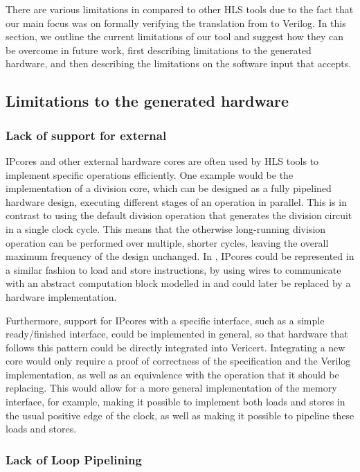 There are various limitations in \vericert{} compared to other HLS tools due to
the fact that our main focus was on formally verifying the translation from
\rtl{} to Verilog.  In this section, we outline the current limitations of our
tool and suggest how they can be overcome in future work, first describing
limitations to the generated hardware, and then describing the limitations on
the software input that \vericert{} accepts.

\subsection{Limitations to the generated hardware}

\subsubsection{Lack of support for external }

\Glspl{IPcore} and other external hardware cores are often used by \gls{HLS}
tools to implement specific operations efficiently.  One example would be the
implementation of a division core, which can be designed as a fully pipelined
hardware design, executing different stages of an operation in parallel.  This
is in contrast to using the default division operation that generates the
division circuit in a single clock cycle.  This means that the otherwise
long-running division operation can be performed over multiple, shorter cycles,
leaving the overall maximum frequency of the design unchanged.  In \htl{},
\glspl{IPcore} could be represented in a similar fashion to load and store
instructions, by using wires to communicate with an abstract computation block
modelled in \htl{} and could later be replaced by a hardware implementation.

Furthermore, support for \glspl{IPcore} with a specific interface, such as a
simple ready/finished interface, could be implemented in general, so that
hardware that follows this pattern could be directly integrated into Vericert.
Integrating a new core would only require a proof of correctness of the
specification and the Verilog implementation, as well as an equivalence with the
operation that it should be replacing.  This would allow for a more general
implementation of the memory interface, for example, making it possible to
implement both loads and stores in the usual positive edge of the clock, as well
as making it possible to pipeline these loads and stores.

\subsubsection{Lack of Loop Pipelining}

